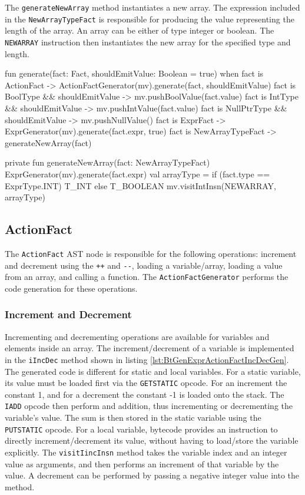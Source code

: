 The \verb|generateNewArray| method instantiates a new array. The expression included in the \verb|NewArrayTypeFact| is responsible for producing the value representing the length of the array. An array can be either of type integer or boolean. The \verb|NEWARRAY| instruction then instantiates the new array for the specified type and length.  

\begin{KotlinCode}[float,numbers=none,caption=Implementation of the \texttt{generate} method of the \texttt{FactGenerator}., label=lst:BtGenExprFactGen]
fun generate(fact: Fact, shouldEmitValue: Boolean = true) {
    when {
       fact is ActionFact -> ActionFactGenerator(mv).generate(fact, shouldEmitValue)
       fact is BoolType && shouldEmitValue -> mv.pushBoolValue(fact.value)
       fact is IntType && shouldEmitValue -> mv.pushIntValue(fact.value)
       fact is NullPtrType && shouldEmitValue -> mv.pushNullValue()
       fact is ExprFact -> ExprGenerator(mv).generate(fact.expr, true)
       fact is NewArrayTypeFact -> generateNewArray(fact)
    }
}

private fun generateNewArray(fact: NewArrayTypeFact) {
    ExprGenerator(mv).generate(fact.expr)
    val arrayType = if (fact.type == ExprType.INT) {
        T_INT
    } else {
        T_BOOLEAN
    }
    mv.visitIntInsn(NEWARRAY, arrayType)
}
\end{KotlinCode}

\subsection{ActionFact}

The \verb|ActionFact| AST node is responsible for the following operations: increment and decrement using the \verb|++| and \verb|--|, loading a variable/array, loading a value from an array, and calling a function. The \verb|ActionFactGenerator| performs the code generation for these operations. 

\subsubsection{Increment and Decrement}

Incrementing and decrementing operations are available for variables and elements inside an array. The increment/decrement of a variable is implemented in the \verb|iIncDec| method shown in listing \ref{lst:BtGenExprActionFactIncDecGen}. The generated code is different for static and local variables. For a static variable, its value must be loaded first via the \verb|GETSTATIC| opcode. For an increment the constant 1, and for a decrement the constant -1 is loaded onto the stack. The \verb|IADD| opcode then perform and addition, thus incrementing or decrementing the variable's value. The sum is then stored in the static variable using the \verb|PUTSTATIC| opcode. For a local variable, bytecode provides an instruction to directly increment/decrement its value, without having to load/store the variable explicitly. The \verb|visitIincInsn| method takes the variable index and an integer value as arguments, and then performs an increment of that variable by the value. A decrement can be performed by passing a negative integer value into the method.


